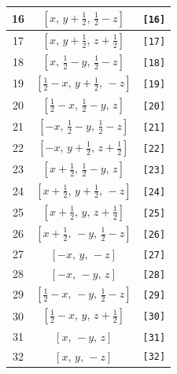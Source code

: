 \documentclass[fleqn,8pt]{jsarticle}
\begin{document}
\begin{longtable}{ccc}
16 & $\left[ x,\, y + \frac{1}{2},\, \frac{1}{2} - z \right]$ & {\tt [16]} \\ \hline
17 & $\left[ x,\, y + \frac{1}{2},\, z + \frac{1}{2} \right]$ & {\tt [17]} \\ \hline
18 & $\left[ x,\, \frac{1}{2} - y,\, \frac{1}{2} - z \right]$ & {\tt [18]} \\ \hline
19 & $\left[ \frac{1}{2} - x,\, y + \frac{1}{2},\, - z \right]$ & {\tt [19]} \\ \hline
20 & $\left[ \frac{1}{2} - x,\, \frac{1}{2} - y,\, z \right]$ & {\tt [20]} \\ \hline
21 & $\left[ - x,\, \frac{1}{2} - y,\, \frac{1}{2} - z \right]$ & {\tt [21]} \\ \hline
22 & $\left[ - x,\, y + \frac{1}{2},\, z + \frac{1}{2} \right]$ & {\tt [22]} \\ \hline
23 & $\left[ x + \frac{1}{2},\, \frac{1}{2} - y,\, z \right]$ & {\tt [23]} \\ \hline
24 & $\left[ x + \frac{1}{2},\, y + \frac{1}{2},\, - z \right]$ & {\tt [24]} \\ \hline
25 & $\left[ x + \frac{1}{2},\, y,\, z + \frac{1}{2} \right]$ & {\tt [25]} \\ \hline
26 & $\left[ x + \frac{1}{2},\, - y,\, \frac{1}{2} - z \right]$ & {\tt [26]} \\ \hline
27 & $\left[ - x,\, y,\, - z \right]$ & {\tt [27]} \\ \hline
28 & $\left[ - x,\, - y,\, z \right]$ & {\tt [28]} \\ \hline
29 & $\left[ \frac{1}{2} - x,\, - y,\, \frac{1}{2} - z \right]$ & {\tt [29]} \\ \hline
30 & $\left[ \frac{1}{2} - x,\, y,\, z + \frac{1}{2} \right]$ & {\tt [30]} \\ \hline
31 & $\left[ x,\, - y,\, z \right]$ & {\tt [31]} \\ \hline
32 & $\left[ x,\, y,\, - z \right]$ & {\tt [32]} \\
\end{longtable}
\end{document}
